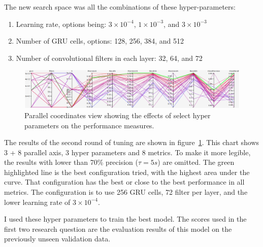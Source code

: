 The new search space was all the combinations of these hyper-parameters:

\begin{enumerate}
    \item Learning rate, options being: $3\times10^{-4}$, $1\times10^{-3}$, and $3\times10^{-3}$
    \item Number of GRU cells, options: 128, 256, 384, and 512
    \item Number of convolutional filters in each layer: 32, 64, and 72
\end{enumerate}

\begin{figure}
    \centering
    \includegraphics[width=\columnwidth]{6_files/refined_prec_recall.png}
    \caption{Parallel coordinates view showing the effects of select hyper parameters on the performance measures.}
    \label{fig:precision_recall_parallel_coordinates}
\end{figure}
The results of the second round of tuning are shown in figure~\ref{fig:precision_recall_parallel_coordinates}. This chart shows 3 + 8 parallel axis, 3 hyper parameters and 8 metrics. To make it more legible, the results with lower than 70\% precision ($\tau = 5s$) are omitted.
The green highlighted line is the best configuration tried, with the highest area under the curve. That configuration has the best or close to the best performance in all metrics. The configuration is to use 256 GRU cells, 72 filter per layer, and the lower learning rate of $3\times10^{-4}$.

I used these hyper parameters to train the best model. The scores used in the first two research question are the evaluation results of this model on the previously unseen validation data. 
